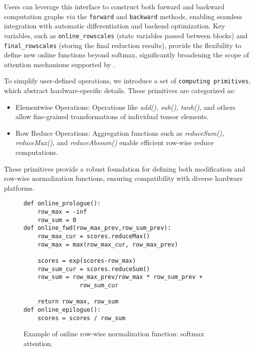 Users can leverage this interface to construct both forward and backward computation graphs via the \texttt{forward} and \texttt{backward} methods, enabling seamless integration with automatic differentiation and backend optimization. Key variables, such as \texttt{online\_rowscales} (state variables passed between blocks) and \texttt{final\_rowscales} (storing the final reduction results), provide the flexibility to define new online functions beyond softmax, significantly broadening the scope of attention mechanisms supported by \oursys{}.

To simplify user-defined operations, we introduce a set of \texttt{computing primitives}, which abstract hardware-specific details. These primitives are categorized as:
\begin{itemize}[noitemsep,topsep=0pt]
    \item Elementwise Operations: Operations like \textit{add(), sub(), tanh()}, and others allow fine-grained transformations of individual tensor elements.
    \item Row Reduce Operations: Aggregation functions such as \textit{reduceSum(), reduceMax()}, and \textit{reduceAbssum()} enable efficient row-wise reduce computations.
\end{itemize}
These primitives provide a robust foundation for defining both modification and row-wise normalization functions, ensuring compatibility with diverse hardware platforms.





\begin{figure}[t]
\begin{lstlisting}
def online_prologue():
    row_max = -inf
    row_sum = 0
def online_fwd(row_max_prev,row_sum_prev):
    row_max_cur = scores.reduceMax()
    row_max = max(row_max_cur, row_max_prev)
    
    scores = exp(scores-row_max)
    row_sum_cur = scores.reduceSum()
    row_sum = row_max_prev/row_max * row_sum_prev +
                row_sum_cur

    return row_max, row_sum
def online_epilogue():
    scores = scores / row_sum
\end{lstlisting}
  \vspace{-3mm}
\caption{Example of online row-wise normalization function: softmax attention.}
  \vspace{-5mm}
\label{fig:softmax-example}
\end{figure}

